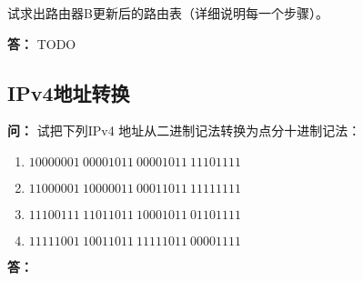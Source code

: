 \documentclass[12pt,hyperref,a4paper,UTF8]{ctexart}
\begin{document}
试求出路由器B更新后的路由表（详细说明每一个步骤）。

\textbf{答：}
TODO

\subsection{IPv4地址转换}
\textbf{问：}
试把下列IPv4 地址从二进制记法转换为点分十进制记法：
\begin{enumerate}[label=\Roman*)]
    \item $10000001 \ 00001011 \ 00001011 \ 11101111$
    \item $11000001 \ 10000011 \ 00011011 \ 11111111$
    \item $11100111 \ 11011011 \ 10001011 \ 01101111$
    \item $11111001 \ 10011011 \ 11111011 \ 00001111$
\end{enumerate}

\textbf{答：}
    \begin{table}[H]     
        \centering
        \caption{129.11.11.239}\label{129.11.11.239}
    \end{table}

    \begin{table} [H]       
        \centering
        \caption{193.131.27.255}\label{193.131.27.255}
    \end{table}
\end{document}
